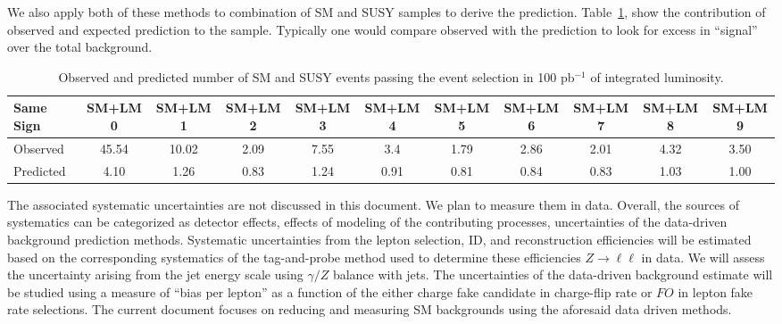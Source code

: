 We also apply both of these methods to combination of SM and SUSY samples to derive the
prediction. Table~\ref{tab:yieldsSUSY}, show the contribution of observed and expected prediction to 
the sample. Typically one would compare observed with the prediction to look for excess 
in ``signal'' over the total background.
\begin{table}[hbt]
\begin{center}
\small\addtolength{\tabcolsep}{-5pt}
\begin{tabular}{|l|c|c|c|c|c|c|c|c|c|c|}\hline
Same Sign  & SM+LM0 & SM+LM1 & SM+LM2 & SM+LM3 & SM+LM4 & SM+LM5 & SM+LM6 & SM+LM7 & SM+LM8 & SM+LM9 \\ \hline
Observed & 45.54 & 10.02 & 2.09 & 7.55 & 3.4 &	1.79 &	2.86 &	2.01 &	4.32 &	3.50 \\ \hline
Predicted & 4.10 & 1.26 & 0.83 & 1.24 &	0.91 &	0.81 &	0.84 &	0.83 &	1.03 &	1.00 \\ \hline
\end{tabular}
\caption{Observed and predicted  number of SM and SUSY events passing the event selection in 100 pb$^{-1}$ of integrated
luminosity.\label{tab:yieldsSUSY}}
\end{center}
\end{table}
The associated systematic uncertainties are not discussed in this document. We plan to measure
them in data. Overall, the sources of systematics can be categorized as detector effects, effects 
of modeling of the contributing processes, uncertainties of the data-driven background 
prediction methods.  Systematic uncertainties from the lepton selection, ID, and reconstruction efficiencies will be
estimated based on the corresponding systematics of the tag-and-probe method used to determine these efficiencies 
$Z \rightarrow \ell \ell$ in data. We will assess the uncertainty arising from the jet energy scale
using $\gamma/Z$ balance with jets. The uncertainties of the data-driven background estimate will be studied using 
a measure of ``bias per lepton'' as a function of the either charge fake candidate in charge-flip rate or $FO$ in
lepton fake rate selections. The current document focuses on reducing and measuring SM backgrounds using the aforesaid
data driven methods.

\clearpage
